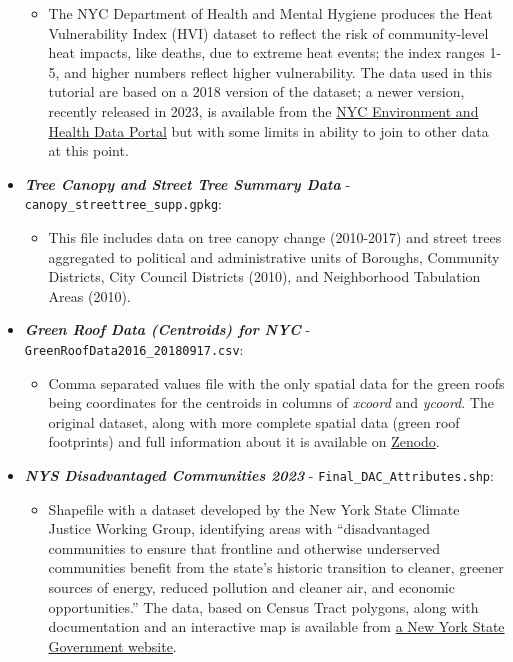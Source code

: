 \documentclass[
  letterpaper,
  DIV=11,
  numbers=noendperiod]{scrreprt}
\providecommand{\tightlist}{%
  \setlength{\itemsep}{0pt}\setlength{\parskip}{0pt}}\usepackage{longtable,booktabs,array}
\begin{document}
\begin{itemize}
  \begin{itemize}
  \tightlist
  \item
    The NYC Department of Health and Mental Hygiene produces the Heat
    Vulnerability Index (HVI) dataset to reflect the risk of
    community-level heat impacts, like deaths, due to extreme heat
    events; the index ranges 1-5, and higher numbers reflect higher
    vulnerability. The data used in this tutorial are based on a 2018
    version of the dataset; a newer version, recently released in 2023,
    is available from the
    \href{https://a816-dohbesp.nyc.gov/IndicatorPublic/data-explorer/weather-related-illness/?id=2191\#display=summary}{NYC
    Environment and Health Data Portal} but with some limits in ability
    to join to other data at this point.
  \end{itemize}
\item
  \textbf{\emph{Tree Canopy and Street Tree Summary Data}} -
  \texttt{canopy\_streettree\_supp.gpkg}:

  \begin{itemize}
  \tightlist
  \item
    This file includes data on tree canopy change (2010-2017) and street
    trees aggregated to political and administrative units of Boroughs,
    Community Districts, City Council Districts (2010), and Neighborhood
    Tabulation Areas (2010).
  \end{itemize}
\item
  \textbf{\emph{Green Roof Data (Centroids) for NYC}} -
  \texttt{GreenRoofData2016\_20180917.csv}:

  \begin{itemize}
  \tightlist
  \item
    Comma separated values file with the only spatial data for the green
    roofs being coordinates for the centroids in columns of
    \emph{xcoord} and \emph{ycoord}. The original dataset, along with
    more complete spatial data (green roof footprints) and full
    information about it is available on
    \href{https://zenodo.org/records/1469674}{Zenodo}.
  \end{itemize}
\item
  \textbf{\emph{NYS Disadvantaged Communities 2023}} -
  \texttt{Final\_DAC\_Attributes.shp}:

  \begin{itemize}
  \tightlist
  \item
    Shapefile with a dataset developed by the New York State Climate
    Justice Working Group, identifying areas with ``disadvantaged
    communities to ensure that frontline and otherwise underserved
    communities benefit from the state's historic transition to cleaner,
    greener sources of energy, reduced pollution and cleaner air, and
    economic opportunities.'' The data, based on Census Tract polygons,
    along with documentation and an interactive map is available from
    \href{https://climate.ny.gov/Resources/Disadvantaged-Communities-Criteria}{a
    New York State Government website}.


\end{itemize}
\end{itemize}
\end{document}
